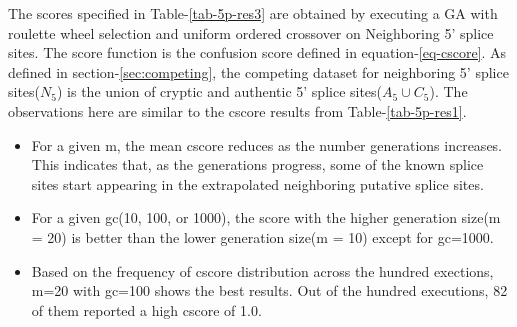 The scores specified in Table-\ref{tab-5p-res3} are obtained by executing a GA with roulette wheel selection and uniform ordered crossover on Neighboring 5' splice sites. The score function is the confusion score defined in equation-\ref{eq-cscore}. As defined in section-\ref{sec:competing}, the competing dataset for neighboring 5' splice sites($N_5$) is the union of cryptic and authentic 5' splice sites($A_5 \cup C_5$). The observations here are similar to the cscore results from Table-\ref{tab-5p-res1}.
\begin{itemize}
	\item For a given m, the mean cscore reduces as the number generations increases. This indicates that, as the generations progress, some of the known splice sites start appearing in the extrapolated neighboring putative splice sites.
	\item For a given gc(10, 100, or 1000), the score with the higher generation size(m = 20) is better than the lower generation size(m = 10) except for gc=1000.
	\item Based on the frequency of cscore distribution across the hundred exections, m=20 with gc=100 shows the best results. Out of the hundred executions, 82 of them reported a high cscore of 1.0.
\end{itemize}
